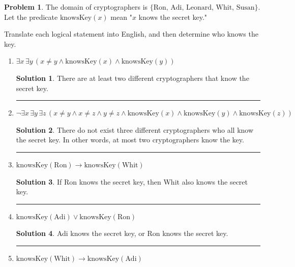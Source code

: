 \documentclass{article}
\theoremstyle{definition}
\newtheorem{problem}{Problem}
\def\fline{\rule{0.75\linewidth}{0.5pt}}
\newcommand{\finishline}{\begin{center}\fline\end{center}}
\newtheorem*{solution*}{Solution}
\newenvironment{solution}{\begin{solution*}}{{\finishline} \end{solution*}}
\begin{document}
    \begin{problem}
    The domain of cryptographers is $\{\text{Ron, Adi, Leonard, Whit, Susan}\}$. Let the predicate $\text{knowsKey}(x)$ mean "$x$ knows the secret key."

    Translate each logical statement into English, and then determine who knows the key.
    \begin{enumerate}[label=(\roman*)]
        \item $\exists x\,\exists y\,(x \neq y \land \text{knowsKey}(x) \land \text{knowsKey}(y))$

        \begin{solution}

There are at least two different cryptographers that know the secret key.

        \end{solution}
        \item $\neg \exists x\,\exists y\,\exists z\,(x\neq y \land x\neq z \land y\neq z \land \text{knowsKey}(x) \land \text{knowsKey}(y) \land \text{knowsKey}(z))$

        \begin{solution}

There do not exist three different cryptographers who all know the
secret key. In other words, at most two cryptographers know the key.


        \end{solution}
        \item $\text{knowsKey}(\text{Ron}) \rightarrow \text{knowsKey}(\text{Whit})$

        \begin{solution}

If Ron knows the secret key, then Whit also knows the secret key.

        \end{solution}
        \item $\text{knowsKey}(\text{Adi}) \lor \text{knowsKey}(\text{Ron})$

        \begin{solution}

Adi knows the secret key, or Ron knows the secret key.

        \end{solution}
        \item $\text{knowsKey}(\text{Whit}) \rightarrow \text{knowsKey}(\text{Adi})$


\end{enumerate}
\end{problem}
\end{document}

